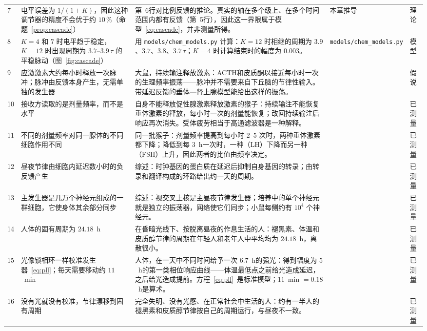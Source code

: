 {\begin{longtable}{>{\raggedright}p{0.5cm}>{\raggedright}p{4.0cm}>{\raggedright}p{5.6cm}>{\raggedright}p{2.3cm}>{\raggedright\arraybackslash}p{1.7cm}}
7 & 电平误差为 $1/(1+K)$，因此这种调节器的精度不会优于约 $10\,\%$（命题~\ref{prop:cascade}） & 第~6行对比例反馈的推论。真实的轴在多个级上、在多个时间范围内都有反馈（第~5行），因此这一界限属于模型~\eqref{eq:cascade}，并非测量所得。 & 本章推导 & 理论 \\
8 & $K=4$ 和 $7$ 时电平趋于稳定，$K=12$ 时出现周期为 $3.7$--$3.9\,\tau$ 的平稳脉动（图~\ref{fig:cascade}） & 用 \texttt{models/\allowbreak chem\_\allowbreak models.py} 计算：$K=12$ 时相继的周期为 $3.9$、$3.7$、$3.8$、$3.7\,\tau$；$K=4$ 时计算结束时的幅度为 $0.003$。 & \texttt{models/\allowbreak chem\_\allowbreak models.py} & 模型 \\
9 & 应激激素大约每小时释放一次脉冲；脉冲由反馈本身产生，无需单独的发生器 & 大鼠，持续输注释放激素：ACTH和皮质酮以接近每小时一次的生理频率振荡——脉冲并不需要来自下丘脑的节律性输入。带延迟反馈的垂体—肾上腺模型能给出这样的振荡。 & \cite{Walker2012glc, Walker2010} & 假说 \\
10 & 接收方读取的是剂量频率，而不是水平 & 自身不能释放促性腺激素释放激素的猴子：持续输注不能恢复垂体激素的释放，每小时一次的剂量能恢复；改回持续输注后响应再次消失。受体疲劳相当于高通滤波器是一种解释。 & \cite{Belchetz1978} & 已测量 \\
11 & 不同的剂量频率对同一腺体的不同细胞作用不同 & 同一批猴子：剂量频率提高到每小时 $2$--$5$ 次时，两种垂体激素都下降；降低到每 $3$~h一次时，一种（LH）下降而另一种（FSH）上升，因此两者的比值由频率决定。 & \cite{Wildt1981gnrh} & 已测量 \\
12 & 昼夜节律由细胞内延迟数小时的负反馈产生 & 综述：时钟基因的蛋白质在延迟后抑制自身基因的转录；由转录和翻译构成的环路给出约一天的周期。 & \cite{TakahashiJS2017} & 已测量 \\
13 & 主发生器是几万个神经元组成的一群细胞，它使身体其余部分同步 & 综述：视交叉上核是主昼夜节律发生器；培养中的单个神经元就是独立的振荡器，网络使它们同步；小鼠每侧约有 $10^4$ 个神经元。 & \cite{Welsh2010scn} & 已测量 \\
14 & 人体的固有周期为 $24.18$~h & 在昏暗光线下、按脱离昼夜的作息生活的人：褪黑素、体温和皮质醇节律的周期在年轻人和老年人中平均均为 $24.18$~h，离散很小。 & \cite{Czeisler1999} & 已测量 \\
15 & 光像锁相环一样校准发生器~\eqref{eq:pll}；每天需要移动约 $11$~min & 人体，在一天中不同时间给予一次 $6.7$~h的强光：得到幅度为 $5$~h的第一类相位响应曲线——体温最低点之前给光造成延迟，之后给光造成提前。方程~\eqref{eq:pll}~是标准模型；$11$~min $=0.18$~h是算术。 & \cite{Khalsa2003prc} & 已测量 \\
16 & 没有光就没有校准，节律漂移到固有周期 & 完全失明、没有光感、在正常社会中生活的人：约有一半人的褪黑素和皮质醇节律按自己的周期运行，与昼夜不一致。 & \cite{Sack1992blind} & 已测量 \\
\bottomrule
\end{longtable}}

